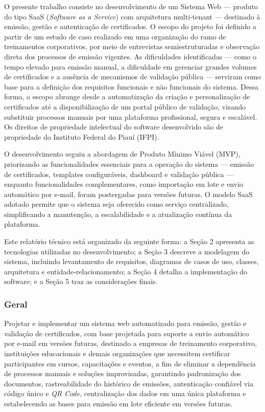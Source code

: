 O presente trabalho consiste no desenvolvimento de um Sistema Web — produto do tipo SaaS (\textit{Software as a Service}) com arquitetura multi-tenant — destinado à emissão, gestão e autenticação de certificados. O escopo do projeto foi definido a partir de um estudo de caso realizado em uma organização do ramo de treinamentos corporativos, por meio de entrevistas semiestruturadas e observação direta dos processos de emissão vigentes. As dificuldades identificadas — como o tempo elevado para emissão manual, a dificuldade em gerenciar grandes volumes de certificados e a ausência de mecanismos de validação pública — serviram como base para a definição dos requisitos funcionais e não funcionais do sistema. Dessa forma, o escopo abrange desde a automatização da criação e personalização de certificados até a disponibilização de um portal público de validação, visando substituir processos manuais por uma plataforma profissional, segura e escalável. Os direitos de propriedade intelectual do software desenvolvido são de propriedade do Instituto Federal do Piauí (IFPI).

O desenvolvimento seguiu a abordagem de Produto Mínimo Viável (MVP), priorizando as funcionalidades essenciais para a operação do sistema — emissão de certificados, templates configuráveis, dashboard e validação pública — enquanto funcionalidades complementares, como importação em lote e envio automático por e-mail, foram postergadas para versões futuras. O modelo SaaS adotado permite que o sistema seja oferecido como serviço centralizado, simplificando a manutenção, a escalabilidade e a atualização contínua da plataforma.

Este relatório técnico está organizado da seguinte forma: a Seção 2 apresenta as tecnologias utilizadas no desenvolvimento; a Seção 3 descreve a modelagem do sistema, incluindo levantamento de requisitos, diagramas de casos de uso, classes, arquitetura e entidade-relacionamento; a Seção 4 detalha a implementação do software; e a Seção 5 traz as considerações finais.


\label{sec:objetivos}

\subsubsection{Geral}\label{sec:objetivo-geral}

Projetar e implementar um sistema web automatizado para emissão, gestão e validação de certificados, com base projetada para suporte a envio automático por e-mail em versões futuras, destinado a empresas de treinamento corporativo, instituições educacionais e demais organizações que necessitem certificar participantes em cursos, capacitações e eventos, a fim de eliminar a dependência de processos manuais e soluções improvisadas, garantindo padronização dos documentos, rastreabilidade do histórico de emissões, autenticação confiável via código único e \textit{QR Code}, centralização dos dados em uma única plataforma e estabelecendo as bases para emissão em lote eficiente em versões futuras.

